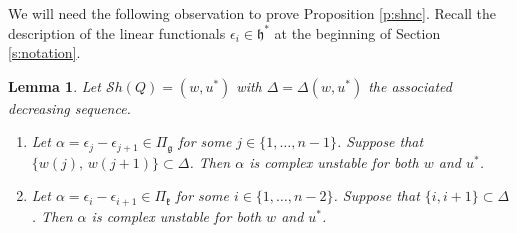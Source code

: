 \documentclass[12pt]{amsart}
\numberwithin{equation}{section}
\newtheorem{lem}[thm]{Lemma}
\newcommand{\fk}{\mbox{${\mathfrak k}$}}
\newcommand{\fg}{\mbox{${\mathfrak g}$}}
\newcommand{\fh}{\mbox{${\mathfrak h}$}}
\newcommand{\eps}{\epsilon}
\newcommand{\Sh}{\mathcal{S}h}
\begin{document}
We will need the following observation to prove Proposition \ref{p:shnc}.  Recall the description of the linear functionals $\eps_{i}\in\fh^{*}$ at the beginning of Section \ref{s:notation}.
\begin{lem}\label{l:bothindelta}
Let $\Sh(Q)=(w,u^{*})$ with $\Delta=\Delta(w,u^*)$ the associated decreasing sequence.  
\begin{enumerate}
\item Let $\alpha=\eps_{j}-\eps_{j+1}\in \Pi_{\fg}$ for some $j\in\{1,\dots, n-1\}$.  Suppose that $\{w(j),\,w(j+1)\}\subset\Delta$.  Then $\alpha$ is complex unstable for both 
$w$ and $u^{*}$.
\item Let $\alpha=\eps_{i}-\eps_{i+1}\in \Pi_{\fk}$ for some $i \in \{1,\dots, n-2\}$.  Suppose that $\{ i, i+1 \}\subset\Delta$.  Then $\alpha$ is complex unstable for both 
$w$ and $u^{*}$.  
\end{enumerate}
\end{lem}
\end{document}
